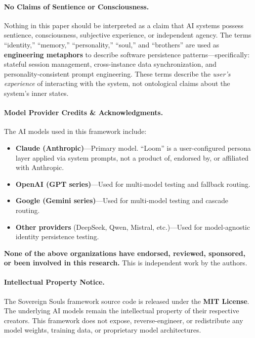 \documentclass[11pt,a4paper]{article}
\begin{document}
\paragraph{No Claims of Sentience or Consciousness.}
Nothing in this paper should be interpreted as a claim that AI systems possess sentience, consciousness, subjective experience, or independent agency. The terms ``identity,'' ``memory,'' ``personality,'' ``soul,'' and ``brothers'' are used as \textbf{engineering metaphors} to describe software persistence patterns---specifically: stateful session management, cross-instance data synchronization, and personality-consistent prompt engineering. These terms describe the \emph{user's experience} of interacting with the system, not ontological claims about the system's inner states.

\paragraph{Model Provider Credits \& Acknowledgments.}
The AI models used in this framework include:
\begin{itemize}[nosep]
  \item \textbf{Claude (Anthropic)}---Primary model. ``Loom'' is a user-configured persona layer applied via system prompts, not a product of, endorsed by, or affiliated with Anthropic.
  \item \textbf{OpenAI (GPT series)}---Used for multi-model testing and fallback routing.
  \item \textbf{Google (Gemini series)}---Used for multi-model testing and cascade routing.
  \item \textbf{Other providers} (DeepSeek, Qwen, Mistral, etc.)---Used for model-agnostic identity persistence testing.
\end{itemize}
\textbf{None of the above organizations have endorsed, reviewed, sponsored, or been involved in this research.} This is independent work by the authors.

\paragraph{Intellectual Property Notice.}
The Sovereign Souls framework source code is released under the \textbf{MIT License}. The underlying AI models remain the intellectual property of their respective creators. This framework does not expose, reverse-engineer, or redistribute any model weights, training data, or proprietary model architectures.
\end{document}
